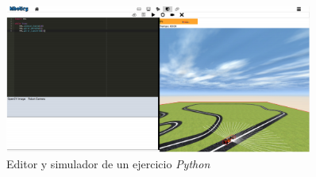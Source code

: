  \begin{figure}[!htb]
  \begin{center}
   \includegraphics[width=0.9\textwidth]{figures/introduccion/kibotics4.png}
		\caption{Editor y simulador de un ejercicio \textit{Python}}
		\label{fig:inKib4}
		\end{center}
\end{figure}


